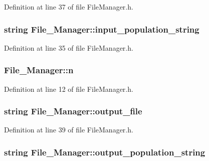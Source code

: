 Definition at line 37 of file File\-Manager.\-h.

\hypertarget{a00001_a80f6d8f738cbc4d10154b470c5422fdd}{
\subsubsection[{input\-\_\-population\-\_\-string}]{\setlength{\rightskip}{0pt plus 5cm}string File\-\_\-\-Manager\-::input\-\_\-population\-\_\-string\hspace{0.3cm}{\ttfamily [private]}}}\label{d8/d84/a00001_a80f6d8f738cbc4d10154b470c5422fdd}


Definition at line 35 of file File\-Manager.\-h.

\hypertarget{a00001_ac70ea2427e95618bb3903b2c57ee9745}{
\subsubsection[{n}]{ File\-\_\-\-Manager\-::n}}\label{d8/d84/a00001_ac70ea2427e95618bb3903b2c57ee9745}


Definition at line 12 of file File\-Manager.\-h.

\hypertarget{a00001_a63725670a06637b4290c54eba671b640}{
\subsubsection[{output\-\_\-file}]{\setlength{\rightskip}{0pt plus 5cm}string File\-\_\-\-Manager\-::output\-\_\-file\hspace{0.3cm}{\ttfamily [private]}}}\label{d8/d84/a00001_a63725670a06637b4290c54eba671b640}


Definition at line 39 of file File\-Manager.\-h.

\hypertarget{a00001_a4266a9bec2fff5d17d7abf06e00384db}{
\subsubsection[{output\-\_\-population\-\_\-string}]{\setlength{\rightskip}{0pt plus 5cm}string File\-\_\-\-Manager\-::output\-\_\-population\-\_\-string\hspace{0.3cm}{\ttfamily [private]}}}\label{d8/d84/a00001_a4266a9bec2fff5d17d7abf06e00384db}


